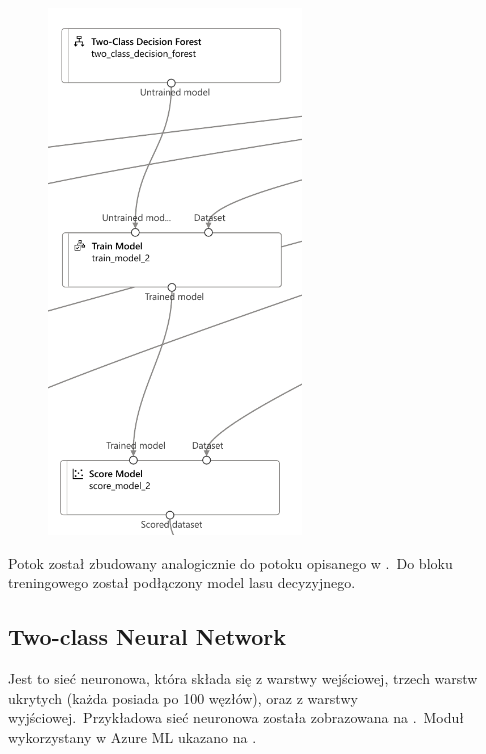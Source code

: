 \begin{figure}[H]
    \centering
    \includegraphics[width=0.6\textwidth]{images/df_pipe}
    \label{fig:df-pipe}
\end{figure}

Potok został zbudowany analogicznie do potoku opisanego w .\ Do bloku treningowego został podłączony model lasu decyzyjnego.

\vfill
\pagebreak

\subsection{Two-class Neural Network}
Jest to sieć neuronowa, która składa się z warstwy wejściowej, trzech warstw ukrytych (każda posiada po 100 węzłów), oraz z warstwy wyjściowej.\ Przykładowa sieć neuronowa została zobrazowana na .\ Moduł wykorzystany w Azure ML ukazano na .

